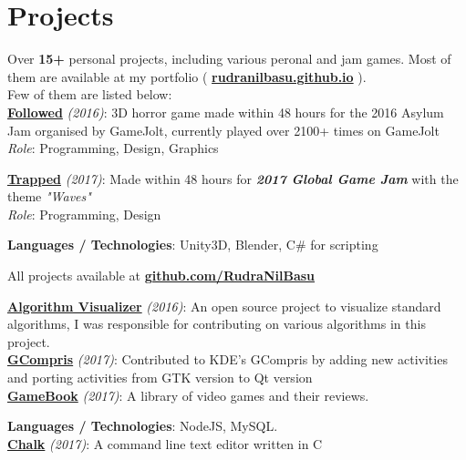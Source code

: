 \documentclass[]{rudra-resume-openfont}
\begin{document}
\begin{minipage}[t]{0.66\textwidth}
\section{Projects}

Over \textbf{15+} personal projects, including various peronal and jam games. Most of them are available at my portfolio ( \textbf{\href{http://rudranilbasu.github.io/}{rudranilbasu.github.io}} ).\\
Few of them are listed below:\\

\textbullet{} \textbf{ \href{http://gamejolt.com/games/followed/208481}{Followed}} \textit{(2016)}: 3D horror game made within 48 hours for the 2016 Asylum Jam organised by GameJolt, currently played over 2100+ times on GameJolt\\
\textit{Role}: Programming, Design, Graphics

\textbullet{} \textbf{ \href{http://gamejolt.com/games/trapped/229317}{Trapped}} \textit{(2017)}: Made within 48 hours for \textit{\textbf{2017 Global Game Jam}} with the theme \textit{"Waves"}\\
\textit{Role}: Programming, Design

\textbf{Languages / Technologies}: Unity3D, Blender, C\# for scripting


\sectionsep

All projects available at \textbf{ \href{https://github.com/RudraNilBasu}{github.com/RudraNilBasu} }

\textbullet{} \textbf{ \href{https://github.com/parkjs814/AlgorithmVisualizer}{Algorithm Visualizer} } \textit{(2016)}: An open source project to visualize standard algorithms, I was responsible for contributing on various algorithms in this project.\\ 
\textbullet{} \textbf{\href{https://github.com/gcompris/GCompris-qt}{GCompris} } \textit{(2017)}: Contributed to KDE's GCompris by adding new activities and porting activities from GTK version to Qt version\\
\textbullet{} \textbf{\href{https://github.com/RudraNilBasu/GameBook}{GameBook} } \textit{(2017)}: A library of video games and their reviews.

\textbf{Languages / Technologies}: NodeJS, MySQL.
\\
\textbullet{} \textbf{\href{https://github.com/BytesClub/chalk}{Chalk} } \textit{(2017)}: A command line text editor written in C
\sectionsep


\end{minipage}
\end{document}
